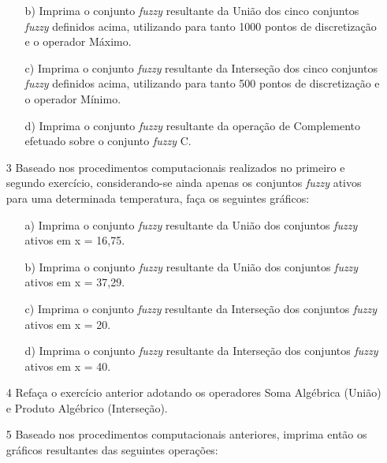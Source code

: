 \documentclass{report}
\begin{document}
\begin{enumerate}
\begin{enumerate}
\item[b)] Imprima o conjunto \emph{fuzzy} resultante da União dos cinco conjuntos \emph{fuzzy} definidos acima,
utilizando para tanto 1000 pontos de discretização e o operador Máximo.


\item[c)] Imprima o conjunto \emph{fuzzy} resultante da Interseção dos cinco conjuntos \emph{fuzzy} definidos
acima, utilizando para tanto 500 pontos de discretização e o operador Mínimo.


\item[d)] Imprima o conjunto \emph{fuzzy} resultante da operação de Complemento efetuado sobre o
conjunto \emph{fuzzy} C. 
\end{enumerate}



\item[3] Baseado nos procedimentos computacionais realizados no primeiro e segundo exercício,
considerando-se ainda apenas os conjuntos \emph{fuzzy} ativos para uma determinada temperatura,
faça os seguintes gráficos:
\begin{enumerate}
\item[a)] Imprima o conjunto \emph{fuzzy} resultante da União dos conjuntos \emph{fuzzy} ativos em x = 16,75.
\item[b)] Imprima o conjunto \emph{fuzzy} resultante da União dos conjuntos \emph{fuzzy} ativos em x = 37,29.
\item[c)] Imprima o conjunto \emph{fuzzy} resultante da Interseção dos conjuntos \emph{fuzzy} ativos em x = 20.
\item[d)] Imprima o conjunto \emph{fuzzy} resultante da Interseção dos conjuntos \emph{fuzzy} ativos em x = 40.
\end{enumerate}


\item[4] Refaça o exercício anterior adotando os operadores Soma Algébrica (União) e Produto
Algébrico (Interseção).


\item[5] Baseado nos procedimentos computacionais anteriores, imprima então os gráficos resultantes
das seguintes operações:


\end{enumerate}
\end{document}
